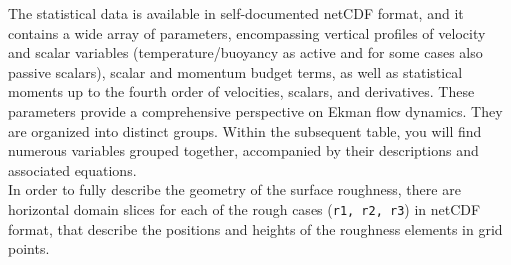 \documentclass[11pt]{article}
\begin{document}
The statistical data is available in self-documented netCDF format, and it contains a wide array of parameters, encompassing vertical profiles of velocity and scalar variables (temperature/buoyancy as active and for some cases also passive scalars), scalar and momentum budget terms, as well as statistical moments up to the fourth order of velocities, scalars, and derivatives. These parameters provide a comprehensive perspective on Ekman flow dynamics. They are organized into distinct groups. Within the subsequent table, you will find numerous variables grouped together, accompanied by their descriptions and associated equations. \\
In order to fully describe the geometry of the surface roughness, there are horizontal domain slices for each of the rough cases (\texttt{r1, r2, r3}) in netCDF format, that describe the positions and heights of the roughness elements in grid points.
\end{document}
